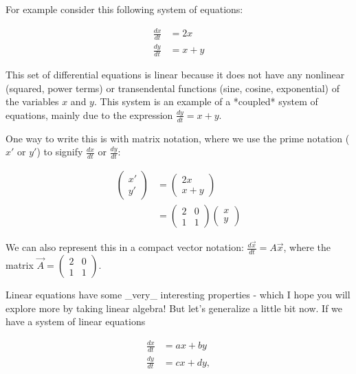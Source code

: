 \documentclass[
]{book}
\theoremstyle{definition}
\theoremstyle{definition}
\theoremstyle{definition}
\theoremstyle{remark}
\begin{document}
For example consider this following system of equations:

\begin{equation}
\begin{split} \label{eq:example-ch15}
\frac{dx}{dt} &= 2x \\ 
\frac{dy}{dt} &= x+y
\end{split}
\end{equation}

This set of differential equations is linear because it does not have any nonlinear (squared, power terms) or transendental functions (sine, cosine, exponential) of the variables $x$ and $y$.  This system is an example of a *coupled* system of equations, mainly due to the expression $\displaystyle \frac{dy}{dt}=x+y$.


One way to write this is with matrix notation, where we use the prime notation ($x'$ or $y'$) to signify  $\displaystyle \frac{dx}{dt}$ or $\displaystyle \frac{dy}{dt}$:

\begin{align}
\begin{pmatrix} x' \\ y' \end{pmatrix} &=  \begin{pmatrix} 2x \\ x+y \end{pmatrix} \\
&=\begin{pmatrix} 2 & 0 \\ 1 &  1 \end{pmatrix} \begin{pmatrix} x \\ y \end{pmatrix}
\end{align}


We can also represent this in a compact vector notation: $\displaystyle \frac{ d \vec{x} }{dt} = A \vec{x}$, where the matrix $\displaystyle \vec{A}=\begin{pmatrix} 2 & 0 \\ 1 &  1 \end{pmatrix}$.

Linear equations have some _very_ interesting properties - which I hope you will explore more by taking linear algebra!  But let's generalize a little bit now.  If we have a system of linear equations

\begin{equation}
\begin{split}
\frac{dx}{dt} &= ax+by \\ 
\frac{dy}{dt} &= cx+dy,
\end{split}
\end{equation}
\end{document}
